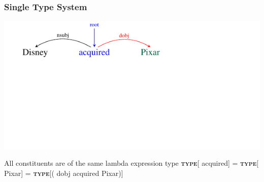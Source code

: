 \documentclass[mathserif,12pt]{beamer}
\newcommand\type[1]{\textbf{\textsc{type}}[#1]\xspace}
\begin{document}
\begin{frame}[noframenumbering]
\frametitle{Single Type System}
\vspace{-3em}
\begin{center}
\includegraphics[trim=2em 9.4em 10em 0em,clip=true,scale=1.3]{figures/pixar_dobj}


\end{center}

\vspace{1cm}

\begin{block}{\centering All constituents are of the same lambda expression type}
\centering
\vspace{0.1cm}
\type{{\color{blue} acquired}} =  \type{{\color{blue!40!green!60!black} Pixar}}  = \type{{({\color{red} dobj} {\color{blue} acquired} {\color{blue!40!green!60!black} Pixar})}}
\vspace{0.1cm}
\end{block}
\end{frame}
\end{document}
